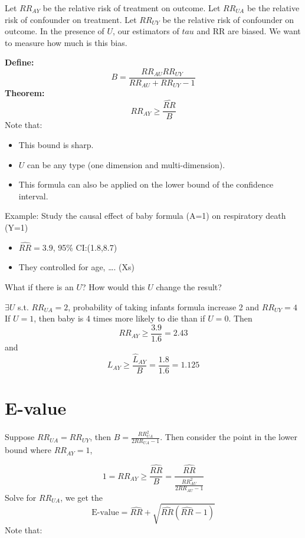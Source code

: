 \documentclass[
]{book}
\providecommand{\tightlist}{%
  \setlength{\itemsep}{0pt}\setlength{\parskip}{0pt}}
\begin{document}
Let \(RR_{AY}\) be the relative risk of treatment on outcome. Let \(RR_{UA}\) be the relative risk of confounder on treatment. Let \(RR_{UY}\) be the relative risk of confounder on outcome. In the presence of \(U\), our estimators of \(tau\) and RR are biased. We want to measure how much is this bias.

\textbf{Define:}
\[B =\frac{RR_{AU}RR_{UY}}{RR_{AU}+RR_{UY}-1}\]
\textbf{Theorem:}
\[RR_{AY} \geq \frac{\hat{RR}}{B}\]
Note that:

\begin{itemize}
\tightlist
\item
  This bound is sharp.
\item
  \(U\) can be any type (one dimension and multi-dimension).
\item
  This formula can also be applied on the lower bound of the confidence interval.
\end{itemize}

Example: Study the causal effect of baby formula (A=1) on respiratory death (Y=1)

\begin{itemize}
\tightlist
\item
  \(\hat{RR} = 3.9\), 95\% CI:(1.8,8.7)
\item
  They controlled for age, \ldots. (Xs)
\end{itemize}

What if there is an \(U\)? How would this \(U\) change the result?

\(\exists U\) s.t. \(RR_{UA} = 2\), probability of taking infants formula increase 2 and \(RR_{UY} = 4\) If \(U=1\), then baby is 4 times more likely to die than if \(U=0\). Then
\[RR_{AY} \geq \frac{3.9}{1.6} = 2.43\] and \[L_{AY} \geq \frac{\hat{L}_{AY}}{B} = \frac{1.8}{1.6} = 1.125\]

\hypertarget{e-value}{%
\section{E-value}\label{e-value}}

Suppose \(RR_{UA} = RR_{UY}\), then \(B = \frac{RR_{UA}^2}{2RR_{UA} -1}\). Then consider the point in the lower bound where \(RR_{AY} = 1\),

\[1 = RR_{AY} \geq \frac{\hat{RR}}{B} = \frac{\hat{RR}}{\frac{RR_{AU}^2}{2RR_{AU} -1}}\]
Solve for \(RR_{UA}\), we get the
\[\text{E-value}=\hat{RR} + \sqrt{\hat{RR}(\hat{RR}-1)}\]
Note that:
\end{document}
